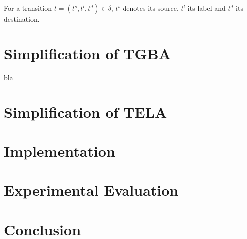 \documentclass[
  digital, %
  twoside, %
  table,   %
  lof,     %
  lot,     %
]{fithesis3}
\begin{document}
For a transition $t = (t^s, t^l, t^d) \in \delta$, $t^s$ denotes its source, $t^l$ its label and $t^d$ its destination.

\cite{bloemen2017}

\chapter{Simplification of TGBA} %
bla \cite{spin2013}
\chapter{Simplification of TELA}

\chapter{Implementation}

\chapter{Experimental Evaluation}

\chapter{Conclusion}



  \printbibliography[heading=bibintoc] %
\end{document}
